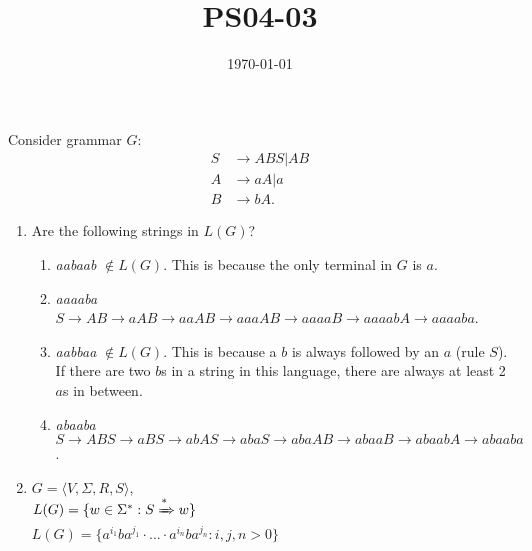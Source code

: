 \documentclass{article}
\title{PS04-03}
\date{\today}
\begin{document}
\maketitle
Consider grammar $G$:
\begin{align*}
    S &\rightarrow ABS | AB\\
    A &\rightarrow aA | a\\
    B &\rightarrow bA.
\end{align*}

\begin{enumerate}[label=\alph*.]
    \item Are the following strings in $L(G)$?
    \begin{enumerate}[label=\roman*.]
        \item \textit{aabaab} $\notin L(G)$. This is because the only terminal in $G$ is $a$.
        \item \textit{aaaaba} $S \rightarrow AB \rightarrow aAB \rightarrow aaAB \rightarrow aaaAB \rightarrow aaaaB \rightarrow aaaabA \rightarrow aaaaba$.
        \item \textit{aabbaa} $\notin L(G)$. This is because a $b$ is always
        followed by an $a$ (rule $S$). If there are two $b$s in a string in
        this language, there are always at least 2 $a$s in between.
        \item \textit{abaaba} $S \rightarrow ABS \rightarrow aBS \rightarrow abAS \rightarrow abaS \rightarrow abaAB \rightarrow abaaB \rightarrow abaabA \rightarrow abaaba$.
    \end{enumerate}
    \item $G = \langle V, \Sigma, R, S \rangle$,\\
    $L(G) = \{w \in \Sigma^* : S \xRightarrow[]{\text{*}} w\}$\\
    $L(G) = \{a^{i_1}ba^{j_1} \cdot... \cdot a^{i_n}ba^{j_n} : i,j,n > 0\}$ %
\end{enumerate}
\end{document}

